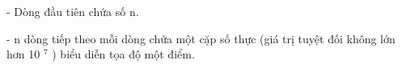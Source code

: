- Dòng đầu tiên chứa số n.  

   - n dòng tiếp theo mỗi dòng chứa một cặp số thực (giá trị tuyệt đối không lớn hơn 10   $^    7   $   ) biểu diễn tọa độ một điểm.